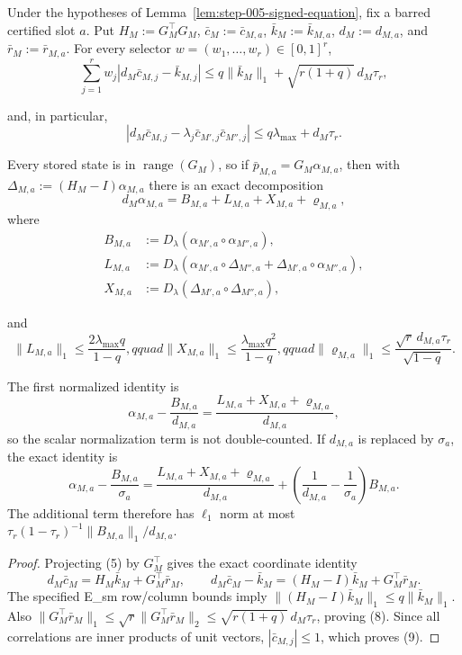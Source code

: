 \begin{proposition}\label{prop:step-005-projected-ledger}
Under the hypotheses of
Lemma~\ref{lem:step-005-signed-equation}, fix a barred certified slot $a$.
Put $H_M:=G_M^\top G_M$, $\bar c_M:=\bar c_{M,a}$,
$\bar k_M:=\bar k_{M,a}$, $d_M:=d_{M,a}$, and
$\bar r_M:=\bar r_{M,a}$.  For every selector
$w=(w_1,\ldots,w_r)\in[0,1]^r$,
\[
\sum_{j=1}^r w_j
\left|d_M\bar c_{M,j}-\bar k_{M,j}\right|
\le q\|\bar k_M\|_1+\sqrt{r(1+q)}\,d_M\tau_r,
\tag{8}
\]

and, in particular,
\[
\left|d_M\bar c_{M,j}-\lambda_j\bar c_{M',j}\bar c_{M'',j}\right|
\le q\lambda_{\max}+d_M\tau_r.
\tag{9}
\]

Every stored state is in $\operatorname{range}(G_M)$, so if
$\bar p_{M,a}=G_M\alpha_{M,a}$, then with
$\Delta_{M,a}:=(H_M-I)\alpha_{M,a}$ there is an exact decomposition
\[
d_M\alpha_{M,a}
=B_{M,a}+L_{M,a}+X_{M,a}+\varrho_{M,a},
\tag{10}
\]
where
\[
\begin{aligned}
B_{M,a}&:=D_\lambda(\alpha_{M',a}\circ\alpha_{M'',a}),\\
L_{M,a}&:=D_\lambda(\alpha_{M',a}\circ\Delta_{M'',a}
 +\Delta_{M',a}\circ\alpha_{M'',a}),\\
X_{M,a}&:=D_\lambda(\Delta_{M',a}\circ\Delta_{M'',a}),
\end{aligned}
\]

and
\[
\|L_{M,a}\|_1\le\frac{2\lambda_{\max}q}{1-q},qquad
\|X_{M,a}\|_1\le\frac{\lambda_{\max}q^2}{1-q},qquad
\|\varrho_{M,a}\|_1
\le\frac{\sqrt r\,d_{M,a}\tau_r}{\sqrt{1-q}}.
\tag{11}
\]

The first normalized identity is
\[
\alpha_{M,a}-\frac{B_{M,a}}{d_{M,a}}
=\frac{L_{M,a}+X_{M,a}+\varrho_{M,a}}{d_{M,a}},
\tag{12}
\]
so the scalar normalization term is not double-counted.  If $d_{M,a}$ is
replaced by $\sigma_a$, the exact identity is
\[
\alpha_{M,a}-\frac{B_{M,a}}{\sigma_a}
 =\frac{L_{M,a}+X_{M,a}+\varrho_{M,a}}{d_{M,a}}
  +\left(\frac1{d_{M,a}}-\frac1{\sigma_a}\right)B_{M,a}.
\tag{12a}
\]
The additional term therefore has $\ell_1$ norm at most
$\tau_r(1-\tau_r)^{-1}\|B_{M,a}\|_1/d_{M,a}$.

\begin{proof}
Projecting (5) by $G_M^\top$ gives the exact
coordinate identity
\[
d_M\bar c_M=H_M\bar k_M+G_M^\top\bar r_M,
\qquad
d_M\bar c_M-\bar k_M=(H_M-I)\bar k_M+G_M^\top\bar r_M.
\tag{13}
\]
The specified E\_sm row/column bounds imply
$\|(H_M-I)\bar k_M\|_1\le q\|\bar k_M\|_1$.  Also
$\|G_M^\top\bar r_M\|_1\le\sqrt r\|G_M^\top\bar r_M\|_2
\le\sqrt{r(1+q)}\,d_M\tau_r$, proving (8).  Since all correlations are inner
products of unit vectors, $|\bar c_{M,j}|\le1$, which proves (9).


\end{proof}
\end{proposition}
